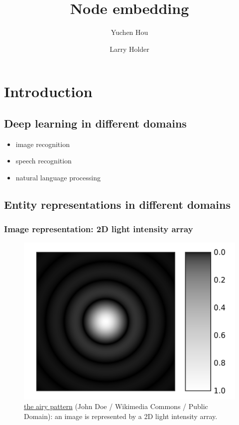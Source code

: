 \documentclass{article}
\begin{document}
\lstset{language=python, tabsize=4}
\title{Node embedding}
\author{Yuchen Hou \and Larry Holder}
\maketitle

\section{Introduction}

\subsection{Deep learning in different domains}
\begin{itemize}
	\item image recognition
	\item speech recognition
	\item natural language processing
\end{itemize}

\subsection{Entity representations in different domains}

\subsubsection{Image representation: 2D light intensity array}
\begin{figure}[H]
	\centering
	\includegraphics[width=0.5\linewidth]{Airy-pattern}
	\caption{\href{https://commons.wikimedia.org/wiki/File:Airy-pattern.svg}{the airy pattern} (John Doe / Wikimedia Commons / Public Domain): an image is represented by a 2D light intensity array.}
	\label{fig:Airy-pattern}
\end{figure}
\end{document}
